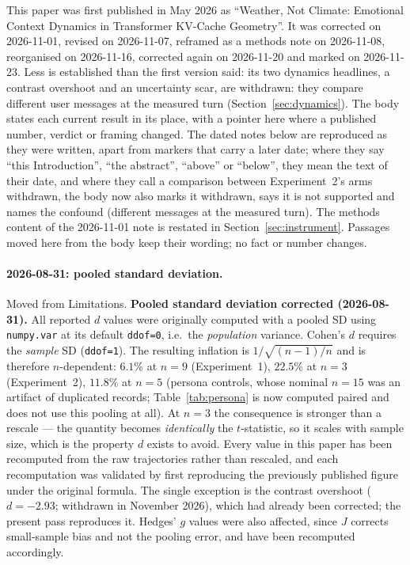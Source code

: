 \documentclass[11pt,a4paper]{article}
\begin{document}
This paper was first published in May 2026 as ``Weather, Not Climate:
Emotional Context Dynamics in Transformer KV-Cache Geometry''. It was
corrected on 2026-11-01, revised on 2026-11-07, reframed as a methods
note on 2026-11-08, reorganised on 2026-11-16, corrected again on
2026-11-20 and marked on 2026-11-23. Less is established
than the first version said: its two dynamics headlines, a contrast
overshoot and an uncertainty scar, are withdrawn: they compare different user messages at
the measured turn (Section~\ref{sec:dynamics}). The body states each
current result in its place, with a pointer here where a published
number, verdict or framing changed. The dated notes below are
reproduced as they were written, apart from markers that carry a later
date; where they say ``this Introduction'',
``the abstract'', ``above'' or ``below'', they mean the text of their
date, and where they call a comparison between Experiment~2's arms
withdrawn, the body now also marks it withdrawn, says it is not supported
and names the confound
(different messages at the measured turn). The methods content of the
2026-11-01 note is restated in Section~\ref{sec:instrument}. Passages
moved here from the body keep their wording; no fact or number changes.

\paragraph{2026-08-31: pooled standard deviation.} Moved from
Limitations. \textbf{Pooled standard deviation corrected (2026-08-31).} All
reported $d$ values were originally computed with a pooled SD using
\texttt{numpy.var} at its default \texttt{ddof=0}, i.e.\ the
\emph{population} variance. Cohen's $d$ requires the \emph{sample} SD
(\texttt{ddof=1}). The resulting inflation is $1/\sqrt{(n-1)/n}$ and is
therefore $n$-dependent: $6.1\%$ at $n{=}9$ (Experiment~1), $22.5\%$ at
$n{=}3$ (Experiment~2), $11.8\%$ at $n{=}5$ (persona controls, whose
nominal $n{=}15$ was an artifact of duplicated records; Table~\ref{tab:persona}
is now computed paired and does not use this pooling at all). At
$n{=}3$ the consequence is stronger than a rescale --- the quantity
becomes \emph{identically} the $t$-statistic, so it scales with sample
size, which is the property $d$ exists to avoid. Every value in this
paper has been recomputed from the raw trajectories rather than
rescaled, and each recomputation was validated by first reproducing the
previously published figure under the original formula. The single
exception is the contrast overshoot ($d{=}-2.93$; withdrawn in November
2026), which had already
been corrected; the present pass reproduces it. Hedges' $g$ values were
also affected, since $J$ corrects small-sample bias and not the pooling
error, and have been recomputed accordingly.
\end{document}
